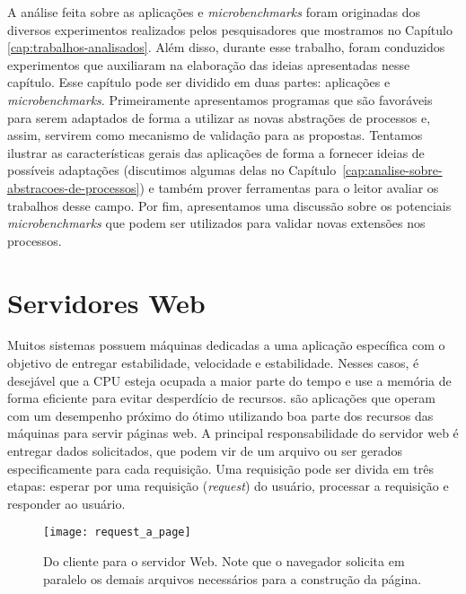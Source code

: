 A análise feita sobre as aplicações e \emph{microbenchmarks} foram originadas
dos diversos experimentos realizados pelos pesquisadores que mostramos no
Capítulo \ref{cap:trabalhos-analisados}. Além disso, durante esse trabalho,
foram conduzidos experimentos que auxiliaram na elaboração das ideias
apresentadas nesse capítulo. Esse capítulo pode ser dividido em duas partes:
aplicações e \emph{microbenchmarks}. Primeiramente apresentamos programas que
são favoráveis para serem adaptados de forma a utilizar as novas abstrações
de processos e, assim, servirem como mecanismo de validação para as propostas.
Tentamos ilustrar as características gerais das aplicações de forma a fornecer
ideias de possíveis adaptações (discutimos algumas delas
no Capítulo~\ref{cap:analise-sobre-abstracoes-de-processos}) e também prover
ferramentas para o leitor avaliar os trabalhos desse campo. Por fim,
apresentamos uma discussão sobre os potenciais \emph{microbenchmarks} que podem
ser utilizados para validar novas extensões nos processos.


\section{Servidores Web}
\label{sec:web_server}

Muitos sistemas possuem máquinas dedicadas a uma aplicação específica com o
objetivo de entregar estabilidade, velocidade e estabilidade. Nesses casos, é
desejável que a CPU esteja ocupada a maior parte do tempo e use a memória de
forma eficiente para evitar desperdício de recursos.  são aplicações que operam com um desempenho próximo
do ótimo utilizando boa parte dos recursos das máquinas para servir páginas
web. A principal responsabilidade do servidor web é entregar dados solicitados,
que podem vir de um arquivo ou ser gerados especificamente para cada
requisição. Uma requisição pode ser divida em três etapas: esperar por uma requisição
(\emph{request}) do usuário, processar a requisição e responder ao usuário.

\begin{figure}[!h]
  \centering
  \texttt{[image: request\_a\_page]}
  \caption[Do cliente para o servidor Web.]{Do cliente para o servidor Web. Note que o navegador solicita em paralelo os demais arquivos necessários para a construção da página.}
  \label{fig:client_to_web_server}
\end{figure}

